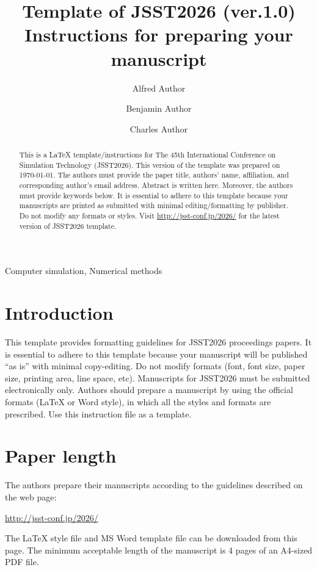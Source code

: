 \documentclass{jasse}%
\title{Template of JSST2026 (ver.1.0)\\ Instructions for preparing your manuscript}
\author[1,*]{Alfred Author}%
\author[2,4]{Benjamin Author}
\author[3]{Charles Author}
\affil[1]{{Department of Simulation, School of Technology, Japan University}}
\affil[2]{{Affiliation 2}}
\affil[3]{{Affiliation 3}}
\affil[4]{{Affiliation 4}}
\begin{document}
\maketitle
\thispagestyle{titlepage}

\begin{abstract}
This is a {\LaTeX} template/instructions for The 45th International Conference on Simulation Technology (JSST2026).
This version of the template was prepared on \today.
The authors must provide the paper title, authors' name, affiliation, and corresponding author's email address.
Abstract is written here.
Moreover, the authors must provide keywords below.
It is essential to adhere to this template because your manuscripts are printed as
submitted with minimal editing/formatting by publisher.
Do not modify any formats or styles.
Visit \url{http://jsst-conf.jp/2026/} for the latest version of JSST2026 template.
\end{abstract}

\begin{keywords}
Computer simulation, Numerical methods
\end{keywords}

\section{Introduction}

This template provides formatting guidelines for JSST2026 proceedings papers. It is essential to adhere to this template because your manuscript will be published “as is” with minimal copy-editing. Do not modify formats (font, font size, paper size, printing area, line space, etc). Manuscripts for JSST2026 must be submitted electronically only. Authors should prepare a manuscript by using the official formats (LaTeX or Word style), in which all the styles and formats are prescribed. Use this instruction file as a template.

\section{Paper length}
The authors prepare their manuscripts according to the guidelines described on the web page:
\begin{center}
\url{http://jsst-conf.jp/2026/}
\end{center}
The LaTeX style file and MS Word template file can be downloaded from this page.
The minimum acceptable length of the manuscript is 4 pages of an A4-sized PDF file.
\end{document}
